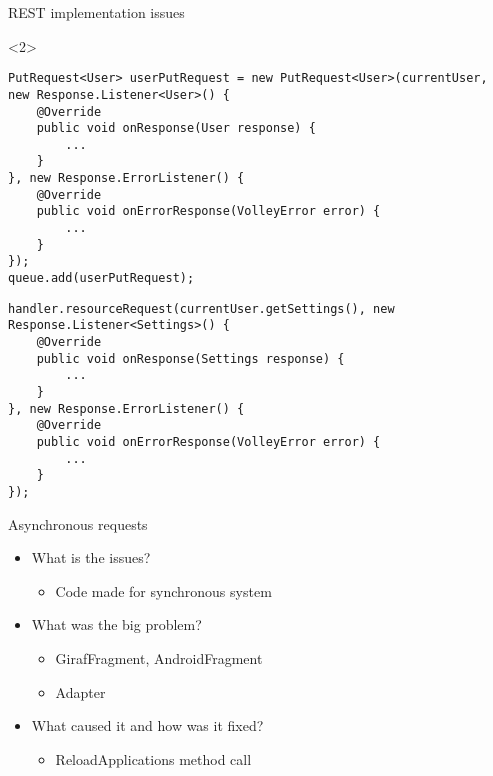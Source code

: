 \begin{frame}[fragile]{REST implementation issues}

\begin{onlyenv}<2>
\begin{center}
\begin{minipage}[H]{0.9\linewidth}
\begin{lstlisting}    
PutRequest<User> userPutRequest = new PutRequest<User>(currentUser, new Response.Listener<User>() {
	@Override
    public void onResponse(User response) {
    	...
    }
}, new Response.ErrorListener() {
    @Override
    public void onErrorResponse(VolleyError error) {
		...
    }
});
queue.add(userPutRequest);
\end{lstlisting} 
\begin{lstlisting}
handler.resourceRequest(currentUser.getSettings(), new Response.Listener<Settings>() {
	@Override
	public void onResponse(Settings response) {
		...	
	}
}, new Response.ErrorListener() {
	@Override
    public void onErrorResponse(VolleyError error) {
    	...
    }
});
\end{lstlisting} 
\end{minipage}
\end{center}
\end{onlyenv}
\end{frame}


\begin{frame}{Asynchronous requests}
\begin{itemize}
  \item What is the issues?
  \begin{itemize}
  \item Code made for synchronous system 
\end{itemize}
  \item What was the big problem?
  \begin{itemize}
  \item GirafFragment, AndroidFragment
  \item Adapter
\end{itemize}
  \item What caused it and how was it fixed?
  \begin{itemize}
  \item ReloadApplications method call
\end{itemize}
\end{itemize}
\end{frame}

